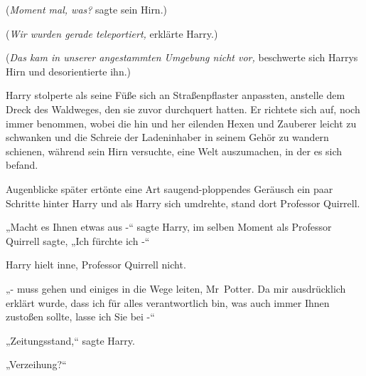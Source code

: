 (\emph{Moment mal, was?} sagte sein Hirn.)

(\emph{Wir wurden gerade teleportiert,} erklärte Harry.)

(\emph{Das kam in unserer angestammten Umgebung nicht vor,} beschwerte sich Harrys Hirn und desorientierte ihn.)

Harry stolperte als seine Füße sich an Straßenpflaster anpassten, anstelle dem Dreck des Waldweges, den sie zuvor durchquert hatten. Er richtete sich auf, noch immer benommen, wobei die hin und her eilenden Hexen und Zauberer leicht zu schwanken und die Schreie der Ladeninhaber in seinem Gehör zu wandern schienen, während sein Hirn versuchte, eine Welt auszumachen, in der es sich befand.

Augenblicke später ertönte eine Art saugend-ploppendes Geräusch ein paar Schritte hinter Harry und als Harry sich umdrehte, stand dort Professor Quirrell.

„Macht es Ihnen etwas aus -“ sagte Harry, im selben Moment als Professor Quirrell sagte, „Ich fürchte ich -“

Harry hielt inne, Professor Quirrell nicht.

„- muss gehen und einiges in die Wege leiten, Mr~Potter. Da mir ausdrücklich erklärt wurde, dass ich für alles verantwortlich bin, was auch immer Ihnen zustoßen sollte, lasse ich Sie bei -“

„Zeitungsstand,“ sagte Harry.

„Verzeihung?“

